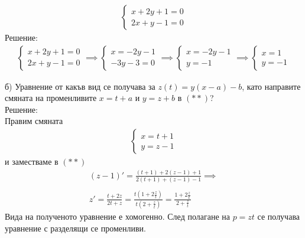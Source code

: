 \documentclass[a4paper, 12pt, oneside]{article}
\begin{document}
\begin{align*}
    \begin{cases}
        x + 2y + 1 = 0 \\
        2x + y - 1 = 0
    \end{cases}
\end{align*}
Решение: \\
\begin{align*}
\begin{cases}
    x + 2y + 1 = 0 \\
    2x + y - 1 = 0
\end{cases} \implies
\begin{cases}
    x = -2y - 1 \\
    -3y - 3 = 0
\end{cases} \implies
\begin{cases}
    x = -2y - 1 \\
    y = -1
\end{cases} \implies \begin{cases}
    x = 1 \\
    y = -1
\end{cases}
\end{align*}

б) Уравнение от какъв вид се получава за $z(t) = y(x - a) -b$, като
направите смяната на променливите $x = t + a$ и $y = z + b$ в $(**)$? \\

Решение: \\

Правим смяната
\begin{align*}
\begin{cases}
    x = t + 1 \\
    y = z - 1
\end{cases}
\end{align*} и заместваме в $(**)$
\begin{align*}
    \left(z - 1\right)' = \displaystyle\frac{\left(t + 1\right) + 2\left(z - 1\right) + 1}{2\left(t + 1\right) + \left(z - 1\right) - 1} \implies \\\\
    z' = \displaystyle\frac{t + 2z}{2t + z} = \displaystyle\frac{t\left(1 + 2\frac{z}{t}\right)}{t\left(2 + \frac{z}{t}\right)} = \displaystyle\frac{1 + 2\frac{z}{t}}{2 + \frac{z}{t}}
\end{align*}
Вида на полученото уравнение е хомогенно. След полагане на $p = zt$ се получава уравнение с разделящи се променливи.
\end{document}
